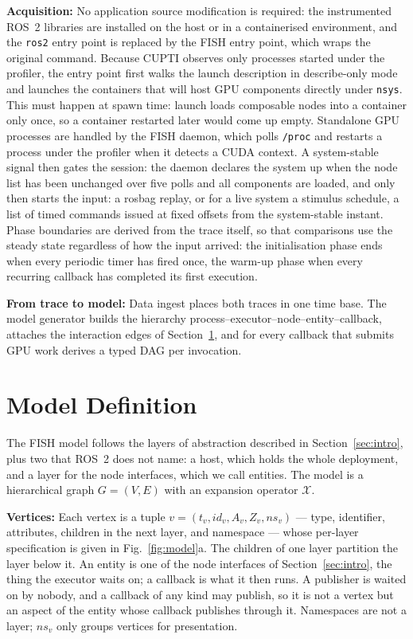 \noindent
\textbf{Acquisition:}
No application source modification is required: the instrumented ROS~2 libraries
are installed on the host or in a containerised environment, and the
\texttt{ros2} entry point is replaced by the FISH entry point, which wraps the
original command. Because CUPTI observes only processes started under the
profiler, the entry point first walks the launch description in describe-only
mode and launches the containers that will host GPU components directly under
\texttt{nsys}. This must happen at spawn time: launch loads composable nodes
into a container only once, so a container restarted later would come up empty.
Standalone GPU processes are handled by the FISH daemon, which polls
\texttt{/proc} and restarts a process under the profiler when it detects a CUDA
context. A system-stable signal then gates the session: the daemon declares the
system up when the node list has been unchanged over five polls and all
components are loaded, and only then starts the input: a rosbag replay, or for a
live system a stimulus schedule, a list of timed commands issued at fixed
offsets from the system-stable instant. Phase boundaries are derived from the
trace itself, so that comparisons use the steady state regardless of how the
input arrived: the initialisation phase ends when every periodic timer has fired
once, the warm-up phase when every recurring callback has completed its first
execution.

\noindent
\textbf{From trace to model:}
Data ingest places both traces in one time base. The model generator builds the
hierarchy process--executor--node--entity--callback, attaches the interaction
edges of Section~\ref{sec:model}, and for every callback that submits GPU work
derives a typed DAG per invocation.





\section{Model Definition}
\label{sec:model}

The FISH model follows the layers of abstraction described in
Section~\ref{sec:intro}, plus two that ROS~2 does not name: a host, which holds
the whole deployment, and a layer for the node interfaces, which we call
entities. The model is a hierarchical graph $G=(V,E)$ with an expansion operator
$\mathcal{X}$.

\noindent
\textbf{Vertices:}
Each vertex is a tuple $v=(t_v,\mathit{id}_v,A_v,Z_v,\mathit{ns}_v)$ --- type,
identifier, attributes, children in the next layer, and namespace --- whose
per-layer specification is given in Fig.~\ref{fig:model}a. The children of one
layer partition the layer below it. An entity is one of the node interfaces of
Section~\ref{sec:intro}, the thing the executor waits on; a callback is what it
then runs. A publisher is waited on by nobody, and a callback of any kind may
publish, so it is not a vertex but an aspect of the entity whose callback
publishes through it. Namespaces are not a layer; $\mathit{ns}_v$ only groups
vertices for presentation.

